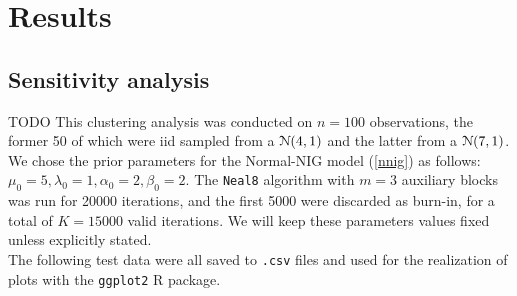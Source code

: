 \part{Results}

\chapter{Sensitivity analysis}
TODO
This clustering analysis was conducted on $n=100$ observations, the former 50 of which were iid sampled from a $\mathcal N(4,1)$ and the latter from a $\mathcal N(7,1)$.
We chose the prior parameters for the Normal-NIG model (\ref{nnig}) as follows: $\mu_0 = 5, \lambda_0 = 1, \alpha_0 = 2, \beta_0 = 2$.
The \verb|Neal8| algorithm with $m=3$ auxiliary blocks was run for 20000 iterations, and the first 5000 were discarded as burn-in, for a total of $K=15000$ valid iterations.
We will keep these parameters values fixed unless explicitly stated. \\
The following test data were all saved to \verb|.csv| files and used for the realization of plots with the \verb|ggplot2| R package.

